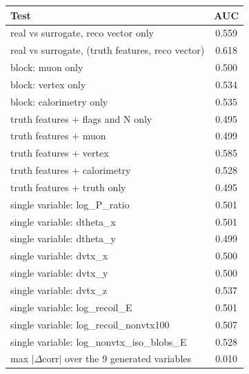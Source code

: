 \begin{tabular}{lc}
\toprule
Test & AUC \\
\midrule
real vs surrogate, reco vector only & 0.559 \\
real vs surrogate, (truth features, reco vector) & 0.618 \\
\midrule
block: muon only & 0.500 \\
block: vertex only & 0.534 \\
block: calorimetry only & 0.535 \\
truth features + flags and N only & 0.495 \\
truth features + muon & 0.499 \\
truth features + vertex & 0.585 \\
truth features + calorimetry & 0.528 \\
truth features + truth only & 0.495 \\
single variable: log\_P\_ratio & 0.501 \\
single variable: dtheta\_x & 0.501 \\
single variable: dtheta\_y & 0.499 \\
single variable: dvtx\_x & 0.500 \\
single variable: dvtx\_y & 0.500 \\
single variable: dvtx\_z & 0.537 \\
single variable: log\_recoil\_E & 0.501 \\
single variable: log\_recoil\_nonvtx100 & 0.507 \\
single variable: log\_nonvtx\_iso\_blobs\_E & 0.528 \\
\midrule
max $|\Delta$corr$|$ over the 9 generated variables & 0.010 \\
\bottomrule
\end{tabular}
